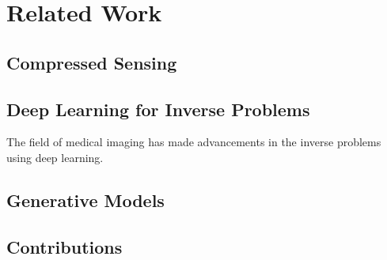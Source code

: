 
\chapter{Related Work}\label{chapter:related_work}

\section{Compressed Sensing}

\section{Deep Learning for Inverse Problems}
The field of medical imaging has made advancements in the inverse problems using deep learning.

\section{Generative Models}

\section{Contributions}
